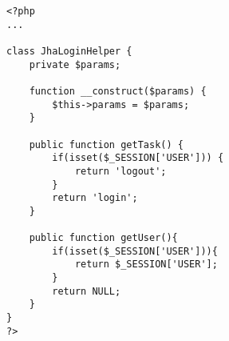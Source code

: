 \begin{lstlisting}[label=jha_block_login_helper,caption=Helper del bloque `Login'.]
<?php
...

class JhaLoginHelper {
	private $params;
	
	function __construct($params) {
		$this->params = $params;
	}
	
    public function getTask() {
    	if(isset($_SESSION['USER'])) {
    		return 'logout';
    	}
    	return 'login';
    }
    
    public function getUser(){
    	if(isset($_SESSION['USER'])){
    		return $_SESSION['USER'];
    	}
    	return NULL;
    }
}
?>
\end{lstlisting}
